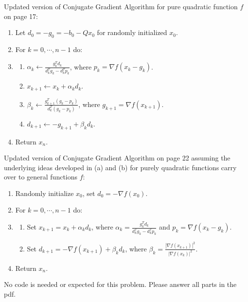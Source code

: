 \documentclass[conference,onecolumn]{IEEEtran}
\begin{document}
\begin{enumerate}
\begin{enumerate}
                        Updated version of Conjugate Gradient Algorithm for pure quadratic function $f$ on page 17:
                        \begin{enumerate}[label=\arabic*.]
                              \item Let $d_0 = -g_0 = -b_0 - Q x_0$ for randomly initialized $x_0$.
                              \item For $k = 0, \cdots, n - 1$ do:
                              \item \begin{enumerate}[label=\alph*.]
                                          \item $\alpha_k \leftarrow \frac{g_k^T d_k}{d_k^T g_k - d_k^T p_k}$, where $p_k = \nabla f(x_k - g_k)$.
                                          \item $x_{k + 1} \leftarrow x_k + \alpha_k d_k$.
                                          \item $\beta_k \leftarrow \frac{g_{k+1}^T (g_k - p_k)}{d_k^T (g_k - p_k)}$, where $g_{k+1} = \nabla f(x_{k + 1})$.
                                          \item $d_{k + 1} \leftarrow -g_{k + 1} + \beta_k d_k$.
                                    \end{enumerate}
                              \item Return $x_n$.
                        \end{enumerate}
                        Updated version of Conjugate Gradient Algorithm on page 22 assuming the underlying ideas
                        developed in (a) and (b) for purely quadratic functions carry over to general functions $f$:
                        \begin{enumerate}[label=\arabic*.]
                              \item Randomly initialize $x_0$, set $d_0 = -\nabla f(x_0)$.
                              \item For $k = 0, \cdots, n - 1$ do:
                              \item \begin{enumerate}[label=\alph*.]
                                          \item Set $x_{k + 1} = x_k + \alpha_k d_k$, where $\alpha_k = \frac{g_k^T d_k}{d_k^T g_k - d_k^T p_k}$ and $p_k = \nabla f(x_k - g_k)$.
                                          \item Set $d_{k + 1} = -\nabla f(x_{k + 1}) + \beta_k d_k$, where $\beta_k = \frac{|\nabla f(x_{k + 1})|^2}{|\nabla f(x_{k})|^2}$.
                                    \end{enumerate}
                              \item Return $x_n$.
                        \end{enumerate}
            \end{enumerate}
            No code is needed or expected for this problem.
            Please answer all parts in the pdf.


\end{enumerate}
\end{document}
